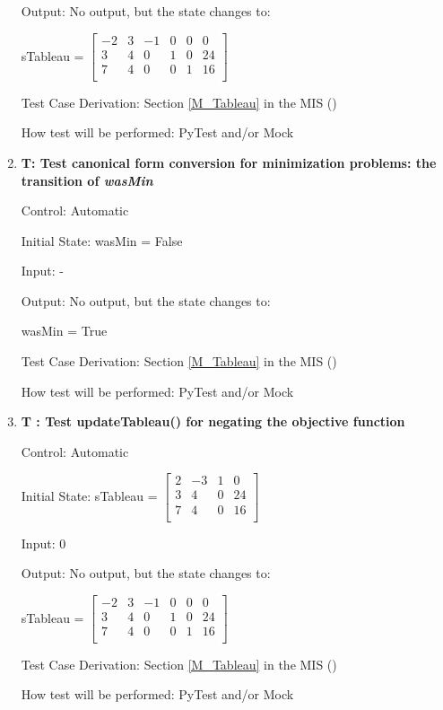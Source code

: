 \documentclass[12pt, titlepage]{article}
\newcounter{testnum} %
\begin{document}
\begin{enumerate}
	Output: No output, but the state changes to:
	
	sTableau = $\begin{bmatrix}
	-2 & 3 & -1 & 0 & 0 & 0\\
	3 & 4 & 0 & 1 & 0 & 24\\
	7 & 4 & 0 & 0 & 1 & 16\\
	\end{bmatrix}$
	
	Test Case Derivation: Section \ref{M_Tableau} in the MIS (\cite{losms-mis})
	
	How test will be performed: PyTest and/or Mock
	
	\item{\textbf{T\thetestnum \label{canonicalMin}: 
	Test canonical form conversion for minimization problems: the transition of 
	\textit{wasMin}}}
	
	Control: Automatic 
	
	Initial State: wasMin = False
	
	Input: -
	
	Output: No output, but the state changes to:
	
	wasMin = True
	
	Test Case Derivation: Section \ref{M_Tableau} in the MIS (\cite{losms-mis})
	
	How test will be performed: PyTest and/or Mock
	
	\item{\textbf{T\thetestnum 
	\label{updateTableauNeg}: Test updateTableau() for negating the objective 
	function}}
	
	Control: Automatic 
	
	Initial State: sTableau = $\begin{bmatrix}
	2 & -3 & 1 & 0\\
	3 & 4 & 0 & 24\\
	7 & 4 & 0 & 16\\
	\end{bmatrix}$
	
	Input: 0
	
	Output: No output, but the state changes to:
	
	sTableau = $\begin{bmatrix}
	-2 & 3 & -1 & 0 & 0 & 0\\
	3 & 4 & 0 & 1 & 0 & 24\\
	7 & 4 & 0 & 0 & 1 & 16\\
	\end{bmatrix}$
	
	Test Case Derivation: Section \ref{M_Tableau} in the MIS (\cite{losms-mis})
	
	How test will be performed: PyTest and/or Mock
	

\end{enumerate}
\end{document}
